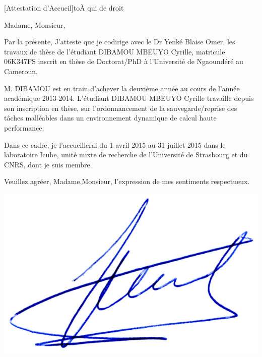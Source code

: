 \documentclass[a4paper,10pt]{article}
\begin{document}

\begin{letter}[Attestation d'Accueil]{to}{\`A qui de droit}

Madame, Monsieur,


Par la présente, J’atteste que je codirige avec le Dr Yenké Blaise Omer,  
les travaux de thèse de l’étudiant DIBAMOU MBEUYO Cyrille, matricule 06K347FS 
inscrit en thèse de Doctorat/PhD à l’Université de Ngaoundéré au Cameroun. 


M. DIBAMOU est en train d’achever la deuxième année au cours de l’année académique 2013-2014. L’étudiant DIBAMOU MBEUYO Cyrille travaille depuis son inscription en thèse, sur l’ordonnancement de la sauvegarde/reprise des tâches malléables dans un environnement dynamique  de calcul haute performance.

Dans ce cadre, je l'accueillerai du 1 avril 2015 au 31 juillet 2015 
dans le laboratoire Icube, unité mixte de recherche 
de l'Université de Strasbourg et du CNRS, dont je suis membre.

Veuillez agréer, Madame,Monsieur, l'expression de mes sentiments respectueux.

\end{letter}
\begin{flushright}
\includegraphics[width=.26\textwidth]{signgenaud.jpg}
\end{flushright}
\end{document}
